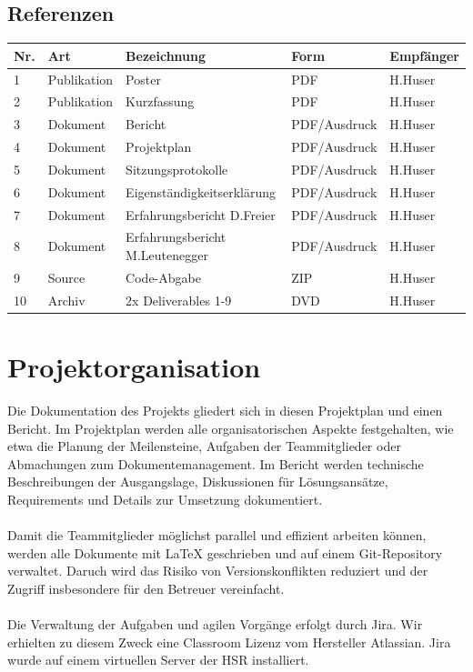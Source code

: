 \subsection*{Referenzen}
\begin{tabularx}{\textwidth}{llXll}
	\textbf{Nr.}	& \textbf{Art} & \textbf{Bezeichnung} & \textbf{Form} & \textbf{Empfänger}\\
	\hline
	1 & Publikation & Poster 							& PDF 			& H.Huser \\	\hline
	2 & Publikation & Kurzfassung 						& PDF 			& H.Huser \\\hline
	3 & Dokument		& Bericht 							& PDF/Ausdruck	& H.Huser \\\hline
	4 & Dokument		& Projektplan 						& PDF/Ausdruck	& H.Huser \\\hline
	5 & Dokument		& Sitzungsprotokolle 				& PDF/Ausdruck	& H.Huser \\\hline
	6 & Dokument		& Eigenständigkeitserklärung			& PDF/Ausdruck	& H.Huser \\\hline
	7 & Dokument		& Erfahrungsbericht D.Freier 		& PDF/Ausdruck	& H.Huser \\\hline
	8 & Dokument		& Erfahrungsbericht M.Leutenegger 	& PDF/Ausdruck	& H.Huser \\\hline
	9 & Source		& Code-Abgabe 						& ZIP			& H.Huser \\\hline
	10& Archiv 		& 2x Deliverables 1-9 				& DVD			& H.Huser \\\hline
\end{tabularx}
\pagebreak


\section*{Projektorganisation}
Die Dokumentation des Projekts gliedert sich in diesen Projektplan und einen Bericht. Im Projektplan werden alle organisatorischen Aspekte festgehalten, wie etwa die Planung der Meilensteine, Aufgaben der Teammitglieder oder Abmachungen zum Dokumentemanagement. Im Bericht werden technische Beschreibungen der Ausgangslage, Diskussionen für Lösungsansätze, Requirements und Details zur Umsetzung dokumentiert. \\
\\
Damit die Teammitglieder möglichst parallel und effizient arbeiten können, werden alle Dokumente mit LaTeX geschrieben und auf einem Git-Repository verwaltet. Daruch wird das Risiko von Versionskonflikten reduziert und der Zugriff insbesondere für den Betreuer vereinfacht. \\
\\
Die Verwaltung der Aufgaben und agilen Vorgänge erfolgt durch Jira. Wir erhielten zu diesem Zweck eine Classroom Lizenz vom Hersteller Atlassian. Jira wurde auf einem virtuellen Server der HSR installiert.

